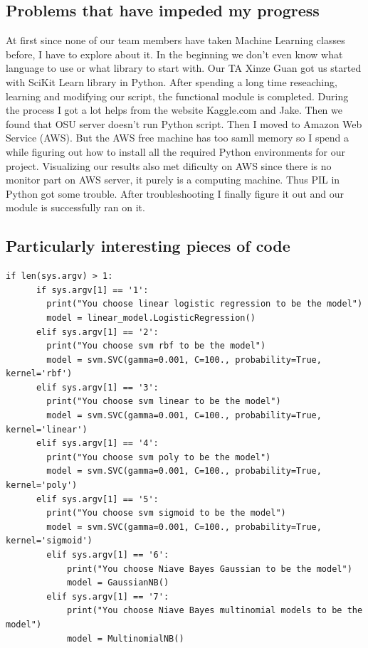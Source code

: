 \documentclass[onecolumn, draftclsnofoot,10pt, compsoc]{IEEEtran}
\begin{document}
\subsection{Problems that have impeded my progress}
At first since none of our team members have taken Machine Learning classes before, I have to explore about it. In the beginning we don't even know what language to use or what library to start with. Our TA Xinze Guan got us started with SciKit Learn library in Python. After spending a long time reseaching, learning and modifying our script, the functional module is completed. During the process I got a lot helps from the website Kaggle.com and Jake. Then we found that OSU server doesn't run Python script. Then I moved to Amazon Web Service (AWS). But the AWS free machine has too samll memory so I spend a while figuring out how to install all the required Python environments for our project. 
Visualizing our results also met dificulty on AWS since there is no monitor part on AWS server, it purely is a computing machine. Thus PIL in Python got some trouble. After troubleshooting I finally figure it out and our module is successfully ran on it. 

\subsection{Particularly interesting pieces of code}
\begin{lstlisting}[caption=Python command line arguments that allow users to use different algorithmns from SciKit Learn, label=list2]
if len(sys.argv) > 1:
      if sys.argv[1] == '1':
        print("You choose linear logistic regression to be the model")
        model = linear_model.LogisticRegression()
      elif sys.argv[1] == '2':
        print("You choose svm rbf to be the model")
        model = svm.SVC(gamma=0.001, C=100., probability=True, kernel='rbf')
      elif sys.argv[1] == '3':
        print("You choose svm linear to be the model")
        model = svm.SVC(gamma=0.001, C=100., probability=True, kernel='linear')
      elif sys.argv[1] == '4':
        print("You choose svm poly to be the model")
        model = svm.SVC(gamma=0.001, C=100., probability=True, kernel='poly')
      elif sys.argv[1] == '5':
        print("You choose svm sigmoid to be the model")
        model = svm.SVC(gamma=0.001, C=100., probability=True, kernel='sigmoid')
        elif sys.argv[1] == '6':
            print("You choose Niave Bayes Gaussian to be the model")
            model = GaussianNB()
        elif sys.argv[1] == '7':
            print("You choose Niave Bayes multinomial models to be the model")
            model = MultinomialNB()
\end{lstlisting}
\end{document}
